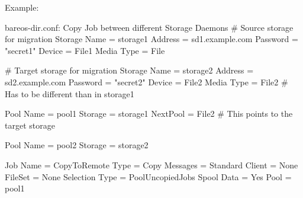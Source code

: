 Example:

\begin{bconfig}{bareos-dir.conf: Copy Job between different Storage Daemons}
# Source storage for migration
Storage {
   Name = storage1
   Address = sd1.example.com
   Password = "secret1"
   Device = File1
   Media Type = File
}

# Target storage for migration
Storage {
   Name = storage2
   Address = sd2.example.com
   Password = "secret2"
   Device = File2
   Media Type = File2   # Has to be different than in storage1
}

Pool {
   Name = pool1
   Storage = storage1
   NextPool = File2    # This points to the target storage
}

Pool {
   Name = pool2
   Storage = storage2
}

Job {
   Name = CopyToRemote
   Type = Copy
   Messages = Standard
   Client = None
   FileSet = None
   Selection Type = PoolUncopiedJobs
   Spool Data = Yes
   Pool = pool1
}
\end{bconfig}
